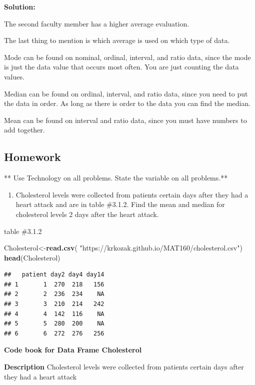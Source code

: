 \documentclass[
]{book}
\newenvironment{Shaded}{\begin{snugshade}}{\end{snugshade}}
\newcommand{\KeywordTok}[1]{\textcolor[rgb]{0.13,0.29,0.53}{\textbf{#1}}}
\newcommand{\NormalTok}[1]{#1}
\newcommand{\StringTok}[1]{\textcolor[rgb]{0.31,0.60,0.02}{#1}}
\providecommand{\tightlist}{%
  \setlength{\itemsep}{0pt}\setlength{\parskip}{0pt}}
\begin{document}
\textbf{Solution:}

The second faculty member has a higher average evaluation.

The last thing to mention is which average is used on which type of data.

Mode can be found on nominal, ordinal, interval, and ratio data, since the mode is just the data value that occurs most often. You are just counting the data values.

Median can be found on ordinal, interval, and ratio data, since you need to put the data in order. As long as there is order to the data you can find the median.

Mean can be found on interval and ratio data, since you must have numbers to add together.

\hypertarget{homework}{%
\subsection{Homework}\label{homework}}

** Use Technology on all problems. State the variable on all problems.**

\begin{enumerate}
\def\labelenumi{\arabic{enumi}.}
\tightlist
\item
  Cholesterol levels were collected from patients certain days after they had a heart attack and are in table \#3.1.2. Find the mean and median for cholesterol levels 2 days after the heart attack.
\end{enumerate}

table \#3.1.2

\begin{Shaded}
\begin{Highlighting}[]
\NormalTok{Cholesterol<-}\KeywordTok{read.csv}\NormalTok{(}
  \StringTok{"https://krkozak.github.io/MAT160/cholesterol.csv"}\NormalTok{)}
\KeywordTok{head}\NormalTok{(Cholesterol)}
\end{Highlighting}
\end{Shaded}

\begin{verbatim}
##   patient day2 day4 day14
## 1       1  270  218   156
## 2       2  236  234    NA
## 3       3  210  214   242
## 4       4  142  116    NA
## 5       5  280  200    NA
## 6       6  272  276   256
\end{verbatim}

\textbf{Code book for Data Frame Cholesterol}

\textbf{Description}
Cholesterol levels were collected from patients certain days after they had a heart attack
\end{document}
